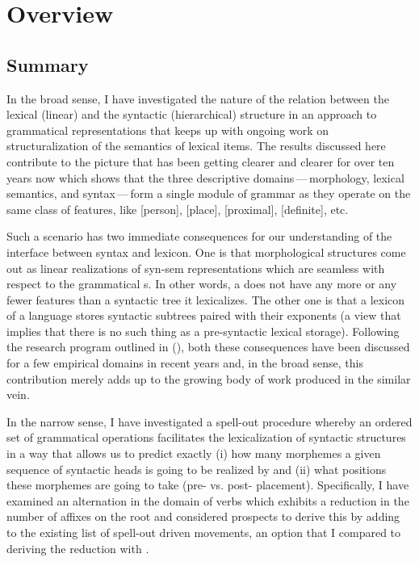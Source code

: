\chapter{Overview}\label{chapter:conclusion}

\section{Summary}

In the broad sense, I have investigated the nature of the relation between the lexical (linear) and the syntactic (hierarchical) structure in an approach to grammatical representations that keeps up with ongoing work on structuralization of the semantics of lexical items. The results discussed here contribute to the picture that has been getting clearer and clearer for over ten years now which shows that the three descriptive domains\,---\,morphology, lexical semantics, and syntax\,---\,form a single module of grammar as they operate on the same class of features, like [person], [place], [proximal], [definite], etc.
\par
Such a scenario has two immediate consequences for our understanding of the interface between syntax and lexicon.  One is that morphological structures come out as linear realizations of syn-sem representations  which are seamless with respect to the grammatical s. In other words, a  does not have any more or any fewer features than a syntactic tree it lexicalizes.  The other one is that a lexicon of a language stores syntactic subtrees paired with their exponents (a view that implies that there is no such thing as a pre-syntactic lexical storage). Following the research program outlined in \citeauthor{Starke2009} (\citeyear{Starke2009,StarkeLA}), both these consequences have been discussed for a few empirical domains in recent years and, in the broad sense, this contribution merely adds up to the growing body of work produced in the similar vein. 
\par
In the narrow sense, I have investigated a spell-out procedure whereby an ordered set of grammatical operations facilitates the  lexicalization of syntactic structures in a way that allows us to predict exactly (i) how many morphemes a given sequence of syntactic heads is going to be realized by and (ii) what positions these morphemes are going to take (pre- vs. post- placement). Specifically, I have examined an  alternation in the domain of  verbs which exhibits a  reduction in the number of affixes on the root and considered prospects to derive this  by adding  to the existing list of spell-out driven movements, an option that I compared to deriving the reduction with .
